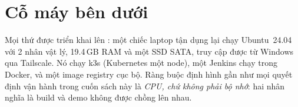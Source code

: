 \section*{Cỗ máy bên dưới}

Mọi thứ được triển khai lên : một chiếc laptop tận dụng
lại chạy Ubuntu~24.04 với 2 nhân vật lý, 19.4\,GB RAM và một SSD SATA,
truy cập được từ Windows qua Tailscale. Nó chạy k3s (Kubernetes một
node), một Jenkins chạy trong Docker, và một image registry cục bộ. Ràng
buộc định hình gần như mọi quyết định vận hành trong cuốn sách này là
\emph{CPU, chứ không phải bộ nhớ}: hai nhân nghĩa là build và demo không
được chồng lên nhau.
